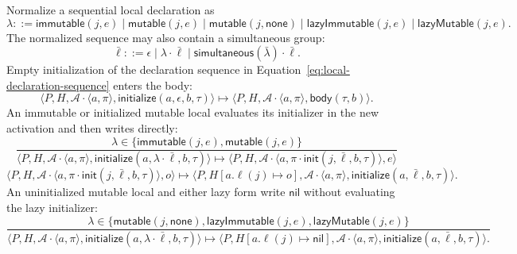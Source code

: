 \documentclass[11pt]{article}
\numberwithin{equation}{section}
\newcommand{\kw}[1]{\ensuremath{\mathsf{#1}}}
\newcommand{\nil}{\kw{nil}}
\begin{document}
Normalize a sequential local declaration as
\begin{equation}\label{eq:local-declaration}
 \lambda::=\kw{immutable}(j,e)\mid\kw{mutable}(j,e)\mid
 \kw{mutable}(j,\kw{none})\mid
 \kw{lazyImmutable}(j,e)\mid\kw{lazyMutable}(j,e).
\end{equation}
The normalized sequence may also contain a simultaneous group:
\begin{equation}\label{eq:local-declaration-sequence}
 \bar\ell::=\epsilon\mid\lambda\cdot\bar\ell
       \mid\kw{simultaneous}(\bar\lambda)\cdot\bar\ell.
\end{equation}
Empty initialization of the declaration sequence in
Equation~\eqref{eq:local-declaration-sequence} enters the body:
\begin{equation}\label{eq:local-init-empty}
 \langle P,H,\mathcal A\cdot\langle a,\pi\rangle,
   \kw{initialize}(a,\epsilon,b,\tau)\rangle
 \longmapsto
 \langle P,H,\mathcal A\cdot\langle a,\pi\rangle,
   \kw{body}(\tau,b)\rangle.
\end{equation}
An immutable or initialized mutable local evaluates its initializer in the new
activation and then writes directly:
\begin{equation}\label{eq:local-init-start}
\dfrac{\lambda\in\{\kw{immutable}(j,e),\kw{mutable}(j,e)\}}
 {\langle P,H,\mathcal A\cdot\langle a,\pi\rangle,
       \kw{initialize}(a,\lambda\cdot\bar\ell,b,\tau)\rangle
  \longmapsto
  \langle P,H,\mathcal A\cdot
       \langle a,\pi\cdot\kw{init}(j,\bar\ell,b,\tau)\rangle,e\rangle}
\end{equation}
\begin{equation}\label{eq:local-init-commit}
 \langle P,H,\mathcal A\cdot
       \langle a,\pi\cdot\kw{init}(j,\bar\ell,b,\tau)\rangle,o\rangle
 \longmapsto
 \langle P,H[a.\ell(j)\mapsto o],
       \mathcal A\cdot\langle a,\pi\rangle,
       \kw{initialize}(a,\bar\ell,b,\tau)\rangle.
\end{equation}
An uninitialized mutable local and either lazy form write $\nil$ without
evaluating the lazy initializer:
\begin{equation}\label{eq:local-init-nil}
\dfrac{\lambda\in\{\kw{mutable}(j,\kw{none}),
        \kw{lazyImmutable}(j,e),\kw{lazyMutable}(j,e)\}}
 {\langle P,H,\mathcal A\cdot\langle a,\pi\rangle,
       \kw{initialize}(a,\lambda\cdot\bar\ell,b,\tau)\rangle
  \longmapsto
  \langle P,H[a.\ell(j)\mapsto\nil],
       \mathcal A\cdot\langle a,\pi\rangle,
       \kw{initialize}(a,\bar\ell,b,\tau)\rangle.}
\end{equation}
\end{document}
